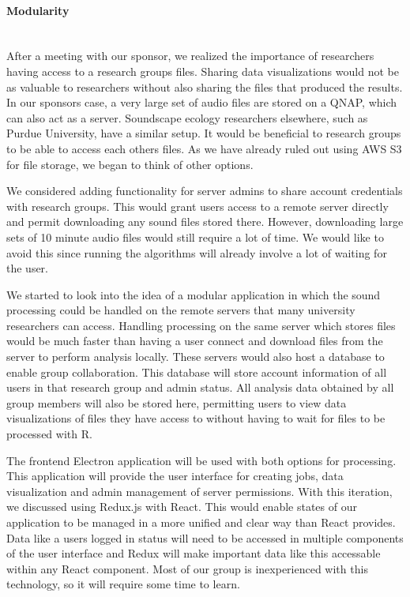 \paragraph{Modularity} \mbox{}\\[\paragraphheaderspace]
After a meeting with our sponsor, we realized the importance of researchers having access to a research group\textquotesingle s files. Sharing data visualizations would not be as valuable to researchers without also sharing the files that produced the results. In our sponsor\textquotesingle s case, a very large set of audio files are stored on a QNAP, which can also act as a server. Soundscape ecology researchers elsewhere, such as Purdue University, have a similar setup. It would be beneficial to research groups to be able to access each other\textquotesingle s files. As we have already ruled out using AWS S3 for file storage, we began to think of other options.\par
We considered adding functionality for server admins to share account credentials with research groups. This would grant users access to a remote server directly and permit downloading any sound files stored there. However, downloading large sets of 10 minute audio files would still require a lot of time. We would like to avoid this since running the  algorithms will already involve a lot of waiting for the user.\par
We started to look into the idea of a modular application in which the sound processing could be handled on the remote servers that many university researchers can access. Handling processing on the same server which stores files would be much faster than having a user connect and download files from the server to perform analysis locally. These servers would also host a database to enable group collaboration. This database will store account information of all users in that research group and admin status. All analysis data obtained by all group members will also be stored here, permitting users to view data visualizations of files they have access to without having to wait for files to be processed with R.\par
The frontend Electron application will be used with both options for processing. This application will provide the user interface for creating jobs, data visualization and admin management of server permissions. With this iteration, we discussed using Redux.js with React. This would enable states of our application to be managed in a more unified and clear way than React provides. Data like a user\textquotesingle s logged in status will need to be accessed in multiple components of the user interface and Redux will make important data like this accessable within any React component. Most of our group is inexperienced with this technology, so it will require some time to learn.\par

